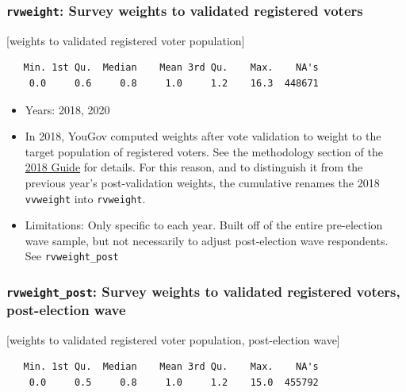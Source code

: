 \documentclass[10pt,article,oneside]{memoir}
\theoremstyle{definition}
\begin{document}
\hypertarget{rvweight-survey-weights-to-validated-registered-voters}{%
\subsubsection{\texorpdfstring{\texttt{rvweight}: Survey weights to
validated registered
voters}{rvweight: Survey weights to validated registered voters}}\label{rvweight-survey-weights-to-validated-registered-voters}}

{[}weights to validated registered voter population{]}

\begin{verbatim}
   Min. 1st Qu.  Median    Mean 3rd Qu.    Max.    NA's 
    0.0     0.6     0.8     1.0     1.2    16.3  448671 
\end{verbatim}

\begin{itemize}
\tightlist
\item
  Years: 2018, 2020
\item
  In 2018, YouGov computed weights after vote validation to weight to
  the target population of registered voters. See the methodology
  section of the \href{https://doi.org/10.7910/DVN/ZSBZ7K}{2018 Guide}
  for details. For this reason, and to distinguish it from the previous
  year's post-validation weights, the cumulative renames the 2018
  \texttt{vvweight} into \texttt{rvweight}.
\item
  Limitations: Only specific to each year. Built off of the entire
  pre-election wave sample, but not necessarily to adjust post-election
  wave respondents. See \texttt{rvweight\_post}
\end{itemize}

\hypertarget{rvweight_post-survey-weights-to-validated-registered-voters-post-election-wave}{%
\subsubsection{\texorpdfstring{\texttt{rvweight\_post}: Survey weights
to validated registered voters, post-election
wave}{rvweight\_post: Survey weights to validated registered voters, post-election wave}}\label{rvweight_post-survey-weights-to-validated-registered-voters-post-election-wave}}

{[}weights to validated registered voter population, post-election
wave{]}

\begin{verbatim}
   Min. 1st Qu.  Median    Mean 3rd Qu.    Max.    NA's 
    0.0     0.5     0.8     1.0     1.2    15.0  455792 
\end{verbatim}
\end{document}

